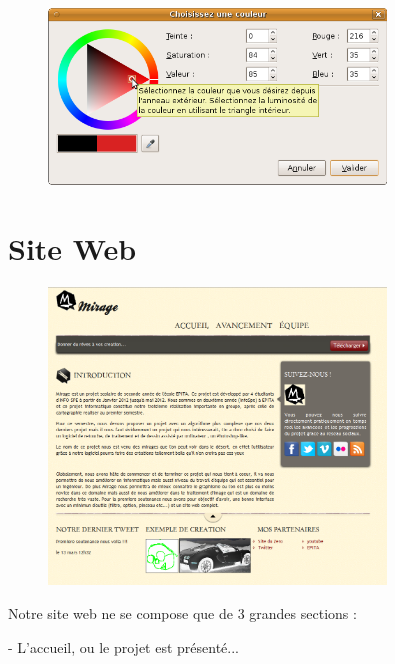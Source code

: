 \documentclass[12pt, a4paper]{report}
\begin{document}
\begin{figure}[!h]
\begin{center} \includegraphics[width=0.8\textwidth]{images/palette.png} \end{center}
\end{figure}


\newpage







\chapter{Site Web}

\begin{figure}[!h]
\begin{center} \includegraphics[width=0.8\textwidth]{images/site.png} \end{center}
\end{figure}

Notre site web ne se compose que de 3 grandes sections :

\par - L'accueil, ou le projet est présenté...
\end{document}
